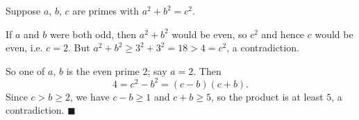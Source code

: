 Suppose $a$, $b$, $c$ are primes with $a^2+b^2=c^2$.

If $a$ and $b$ were both odd, then $a^2+b^2$ would be even, so $c^2$ and hence $c$ would be even, i.e. $c=2$. But $a^2+b^2\ge3^2+3^2=18>4=c^2$, a contradiction.

So one of $a$, $b$ is the even prime $2$; say $a=2$. Then
\[4=c^2-b^2=(c-b)(c+b).\]
Since $c>b\ge2$, we have $c-b\ge1$ and $c+b\ge5$, so the product is at least $5$, a contradiction. $\blacksquare$
